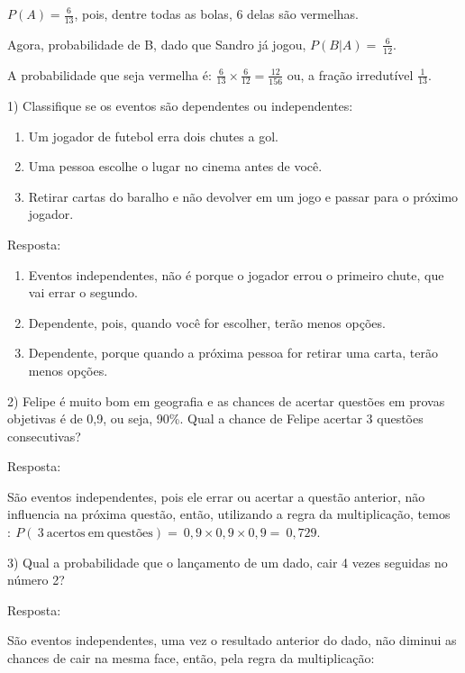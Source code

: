 \(P(A) = \frac{6}{13}\), pois, dentre todas as bolas, 6 delas são
vermelhas.

Agora, probabilidade de B, dado que Sandro já jogou,
\(P(B|A) = \ \frac{6}{12}\).

A probabilidade que seja vermelha é:
\(\frac{6}{13} \times \frac{6}{12} = \frac{12}{156}\) ou, a fração
irredutível \(\frac{1}{13}\).


1) Classifique se os eventos são dependentes ou independentes:

\begin{enumerate}
\def\labelenumi{\alph{enumi})}
\item
  Um jogador de futebol erra dois chutes a gol.
\item
  Uma pessoa escolhe o lugar no cinema antes de você.
\item
  Retirar cartas do baralho e não devolver em um jogo e passar para o
  próximo jogador.
\end{enumerate}

Resposta:

\begin{enumerate}
\def\labelenumi{\alph{enumi})}
\item
  Eventos independentes, não é porque o jogador errou o primeiro chute,
  que vai errar o segundo.
\item
  Dependente, pois, quando você for escolher, terão menos opções.
\item
  Dependente, porque quando a próxima pessoa for retirar uma carta,
  terão menos opções.
\end{enumerate}

2) Felipe é muito bom em geografia e as chances de acertar questões em
provas objetivas é de 0,9, ou seja, 90\%. Qual a chance de Felipe
acertar 3 questões consecutivas?

Resposta:

São eventos independentes, pois ele errar ou acertar a questão anterior,
não influencia na próxima questão, então, utilizando a regra da
multiplicação,
temos\(:\ P(\ 3\ \text{acertos}\ \text{em}\ \text{quest}õ\text{es}) = \ 0,9 \times 0,9 \times 0,9 = \ 0,729.\)

3) Qual a probabilidade que o lançamento de um dado, cair 4 vezes
seguidas no número 2?

Resposta:

São eventos independentes, uma vez o resultado anterior do dado, não
diminui as chances de cair na mesma face, então, pela regra da
multiplicação:

